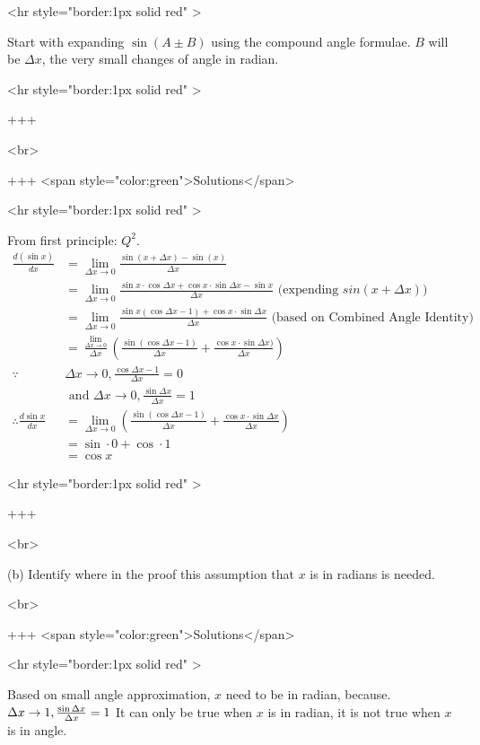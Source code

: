 <hr style="border:1px solid red" >

Start with expanding $\sin(A \pm B)$ using the compound angle formulae. $B$ will be $\Delta x$, the very small changes of angle in radian.

<hr style="border:1px solid red" >

+++

<br>

+++ <span style="color:green">Solutions</span>

<hr style="border:1px solid red" >


From first principle: $Q^2$.
$$
\begin{aligned}
\frac{d(\sin x)}{d x} & =\lim _{\Delta x \rightarrow 0} \frac{\sin (x+\Delta x)-\sin (x)}{\Delta x} \\
& =\lim _{\Delta x \rightarrow 0} \frac{\sin x \cdot \cos \Delta x+\cos x \cdot \sin \Delta x-\sin x}{\Delta x} \text { (expending $sin (x+\Delta x)$) } \\
& =\lim _{\Delta x \rightarrow 0} \frac{\sin x(\cos \Delta x-1)+\cos x \cdot \sin \Delta x}{\Delta x} \text { (based on Combined Angle Identity) } \\
& =\frac{\lim _{\Delta x \rightarrow 0}}{\Delta x}\left(\frac{\sin (\cos \Delta x-1)}{\Delta x}+\frac{\cos x \cdot \sin \Delta x)}{\Delta x}\right) \\
\because & \Delta x \rightarrow 0, \frac{\cos \Delta x-1}{\Delta x}=0\\
& \text { and } \Delta x \rightarrow 0, \frac{\sin \Delta x}{\Delta x}=1 \quad\\
\therefore \frac{d \sin x}{d x} &= \lim _{\Delta x \rightarrow 0}\left(\frac{\sin (\cos \Delta x-1)}{\Delta x}+\frac{\cos x \cdot \sin \Delta x}{\Delta x}\right) \\
& =\sin \cdot 0+\cos \cdot 1 \\
& =\cos x
\end{aligned}
$$

<hr style="border:1px solid red" >

+++

<br>

(b) Identify where in the proof this assumption that $x$ is in radians is needed.

<br>

+++ <span style="color:green">Solutions</span>

<hr style="border:1px solid red" >

Based on small angle approximation, $x$ need to be in radian, because. $\Delta x \rightarrow 1, \space\frac{\sin \Delta x}{\Delta x}=1$
It can only be true when $x$ is in radian, it is not true when $x$ is in angle.

